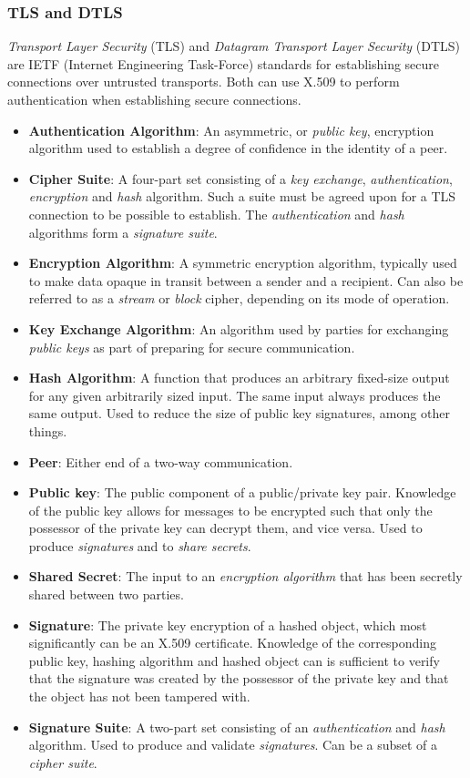 \subsubsection{TLS and DTLS}

\textit{Transport Layer Security} (TLS) and \textit{Datagram Transport Layer Security} (DTLS) are IETF (Internet Engineering Task-Force) standards for establishing secure connections over untrusted transports.
Both can use X.509 to perform authentication when establishing secure connections.

\begin{itemize}
\item \textbf{Authentication Algorithm}: An asymmetric, or \textit{public key}, encryption algorithm used to establish a degree of confidence in the identity of a peer.
\item \textbf{Cipher Suite}: A four-part set consisting of a \textit{key exchange}, \textit{authentication}, \textit{encryption} and \textit{hash} algorithm. Such a suite must be agreed upon for a TLS connection to be possible to establish. The \textit{authentication} and \textit{hash} algorithms form a \textit{signature suite}.
\item \textbf{Encryption Algorithm}: A symmetric encryption algorithm, typically used to make data opaque in transit between a sender and a recipient. Can also be referred to as a \textit{stream} or \textit{block} cipher, depending on its mode of operation.
\item \textbf{Key Exchange Algorithm}: An algorithm used by parties for exchanging \textit{public keys} as part of preparing for secure communication.
\item \textbf{Hash Algorithm}: A function that produces an arbitrary fixed-size output for any given arbitrarily sized input. The same input always produces the same output. Used to reduce the size of public key signatures, among other things.
\item \textbf{Peer}: Either end of a two-way communication.
\item \textbf{Public key}: The public component of a public/private key pair. Knowledge of the public key allows for messages to be encrypted such that only the possessor of the private key can decrypt them, and vice versa. Used to produce \textit{signatures} and to \textit{share secrets}.
\item \textbf{Shared Secret}: The input to an \textit{encryption algorithm} that has been secretly shared between two parties.
\item \textbf{Signature}: The private key encryption of a hashed object, which most significantly can be an X.509 certificate. Knowledge of the corresponding public key, hashing algorithm and hashed object can is sufficient to verify that the signature was created by the possessor of the private key and that the object has not been tampered with.
\item \textbf{Signature Suite}: A two-part set consisting of an \textit{authentication} and \textit{hash} algorithm. Used to produce and validate \textit{signatures}. Can be a subset of a \textit{cipher suite}.
\end{itemize}

